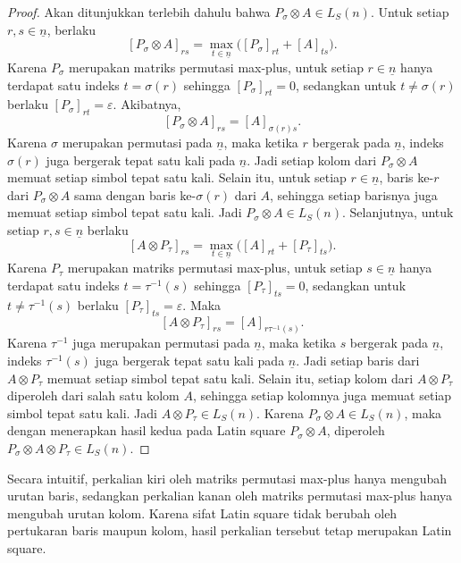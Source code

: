\begin{proof}
  Akan ditunjukkan terlebih dahulu bahwa $P_\sigma\otimes A\in L_S(n)$.
  Untuk setiap $r,s\in \underline{n}$, berlaku
  \[
    [P_\sigma\otimes A]_{rs}
    =
    \max_{t\in \underline{n}}\bigl([P_\sigma]_{rt}+[A]_{ts}\bigr).
  \]
  Karena $P_\sigma$ merupakan matriks permutasi max-plus, untuk setiap
  $r\in \underline{n}$ hanya terdapat satu indeks $t=\sigma(r)$ sehingga
  $[P_\sigma]_{rt}=0$, sedangkan untuk $t\neq\sigma(r)$ berlaku
  $[P_\sigma]_{rt}=\varepsilon$. Akibatnya,
  \[
    [P_\sigma\otimes A]_{rs}
    =
    [A]_{\sigma(r)s}.
  \]
  Karena $\sigma$ merupakan permutasi pada $\underline{n}$, maka ketika $r$ bergerak pada
  $\underline{n}$, indeks $\sigma(r)$ juga bergerak tepat satu kali pada $\underline{n}$. Jadi setiap
  kolom dari $P_\sigma\otimes A$ memuat setiap simbol tepat satu kali.
  Selain itu, untuk setiap $r\in \underline{n}$, baris ke-$r$ dari
  $P_\sigma\otimes A$ sama dengan baris ke-$\sigma(r)$ dari $A$, sehingga
  setiap barisnya juga memuat setiap simbol tepat satu kali. Jadi
  $P_\sigma\otimes A\in L_S(n)$. Selanjutnya, untuk setiap $r,s\in \underline{n}$ berlaku
  \[
    [A\otimes P_\tau]_{rs}
    =
    \max_{t\in \underline{n}}\bigl([A]_{rt}+[P_\tau]_{ts}\bigr).
  \]
  Karena $P_\tau$ merupakan matriks permutasi max-plus, untuk setiap
  $s\in \underline{n}$ hanya terdapat satu indeks $t=\tau^{-1}(s)$ sehingga
  $[P_\tau]_{ts}=0$, sedangkan untuk $t\neq \tau^{-1}(s)$ berlaku
  $[P_\tau]_{ts}=\varepsilon$. Maka
  \[
    [A\otimes P_\tau]_{rs}
    =
    [A]_{r\tau^{-1}(s)}.
  \]
  Karena $\tau^{-1}$ juga merupakan permutasi pada $\underline{n}$, maka ketika $s$
  bergerak pada $\underline{n}$, indeks $\tau^{-1}(s)$ juga bergerak tepat satu kali pada $\underline{n}$. Jadi setiap baris dari $A\otimes P_\tau$ memuat setiap simbol tepat satu kali. Selain itu, setiap kolom dari $A\otimes P_\tau$ diperoleh dari salah satu kolom $A$, sehingga setiap kolomnya juga memuat setiap simbol tepat satu kali. Jadi $A\otimes P_\tau\in L_S(n)$. Karena $P_\sigma\otimes A\in L_S(n)$, maka dengan menerapkan hasil kedua pada Latin square $P_\sigma\otimes A$, diperoleh $P_\sigma\otimes A\otimes P_\tau\in L_S(n)$.
\end{proof}
Secara intuitif, perkalian kiri oleh matriks permutasi max-plus hanya mengubah urutan baris, sedangkan perkalian kanan oleh matriks permutasi max-plus hanya mengubah urutan kolom. Karena sifat Latin square tidak berubah oleh pertukaran baris maupun kolom, hasil perkalian tersebut tetap merupakan Latin square.

